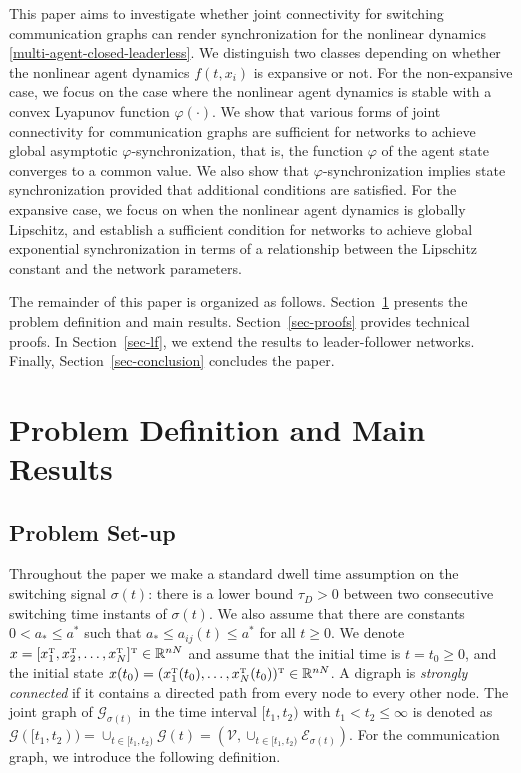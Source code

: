 \documentclass[a4paper, 11pt]{article}
\newcommand{\T}{^{\mbox{\tiny T}}}
\def\R{\mathbb{R}}
\begin{document}
This paper aims to investigate whether joint connectivity for switching communication graphs
can render synchronization for the nonlinear dynamics \eqref{multi-agent-closed-leaderless}.
We distinguish two classes depending on whether the nonlinear agent dynamics $f(t,x_i)$ is expansive or not.
For the non-expansive case, we focus on the case where the nonlinear agent dynamics is stable with a convex Lyapunov function $\varphi(\cdot)$. We show that various forms of joint connectivity for communication graphs are
sufficient for networks to achieve global asymptotic $\varphi$-synchronization, that is, the function $\varphi$ of the agent state converges to a common value.
We also show that $\varphi$-synchronization implies state synchronization provided that additional conditions are satisfied.
For the expansive case, we focus on when the nonlinear agent dynamics is globally Lipschitz, and
establish a sufficient condition for networks to achieve global exponential synchronization in terms of a relationship between the Lipschitz constant and the network parameters.

The remainder of this paper is organized as follows. Section~\ref{sec-prob} presents the problem definition and main results. Section~\ref{sec-proofs} provides technical proofs. In Section~\ref{sec-lf}, we extend the results to leader-follower networks. Finally, Section~\ref{sec-conclusion} concludes the paper. 

\section{Problem Definition and Main Results}\label{sec-prob}
\subsection{Problem Set-up}
Throughout the paper we make a standard dwell time assumption \cite{liberzon-morse} on  the switching signal $\sigma(t)$: there is a lower bound $\tau_D>0$ between two consecutive switching time instants of $\sigma(t)$. We also assume that
there are constants $0<a_{*} \leq a^{*}$ such that
$a_{*} \leq a_{ij}(t)\leq a^{*}$ for all $t \geq 0$.
We denote $x=[x\T_1,x\T_2,\ldots,x\T_N]\T \in \R^{nN}$ and
assume that the initial time is $t=t_0\geq 0$, and the initial state $x(t_0)=(x\T_1(t_0),\ldots,x\T_N(t_0))\T \in {\R}^{nN}$.
A digraph is {\it strongly connected} if it contains a directed path from every node to every other node.
The joint graph of $\mathcal{G}_{\sigma(t)}$ in the time interval $[t_1,t_2)$ with $t_1 < t_2 \leq \infty$ is denoted as $\mathcal{G}([t_1,t_2))=\cup _{t \in [t_1,t_2)} \mathcal{G}(t)=(\mathcal{V}, \cup_{t \in [t_1,t_2)} \mathcal{E}_{\sigma(t)})$.
For the communication graph, we introduce the following definition.
\end{document}
